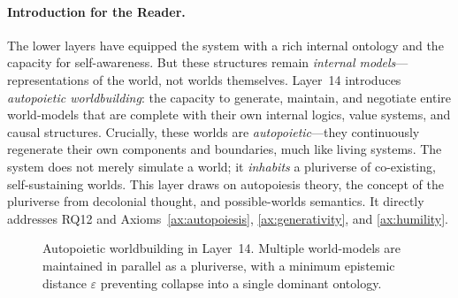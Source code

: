 \paragraph{Introduction for the Reader.}
The lower layers have equipped the system with a rich internal ontology and the capacity for self-awareness. But these structures remain \emph{internal models}—representations of the world, not worlds themselves. Layer~14 introduces \emph{autopoietic worldbuilding}: the capacity to generate, maintain, and negotiate entire world-models that are complete with their own internal logics, value systems, and causal structures. Crucially, these worlds are \emph{autopoietic}—they continuously regenerate their own components and boundaries, much like living systems. The system does not merely simulate a world; it \emph{inhabits} a pluriverse of co-existing, self-sustaining worlds. This layer draws on autopoiesis theory, the concept of the pluriverse from decolonial thought, and possible-worlds semantics. It directly addresses RQ12 and Axioms~\ref{ax:autopoiesis}, \ref{ax:generativity}, and \ref{ax:humility}.

\begin{figure}[htbp]
    \centering
    \caption{Autopoietic worldbuilding in Layer~14. Multiple world-models are maintained in parallel as a pluriverse, with a minimum epistemic distance $\varepsilon$ preventing collapse into a single dominant ontology.}
    \label{fig:layer14}
\end{figure}


